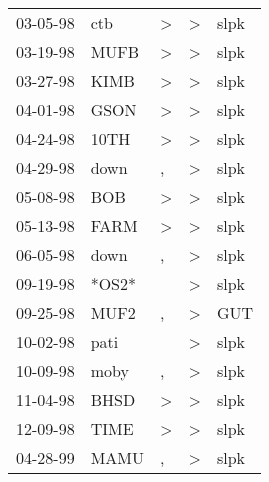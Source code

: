 \begin{supertabular}{p{0.07\textwidth}p{0.06\textwidth}p{0.02\textwidth}p{0.02\textwidth}p{0.06\textwidth}}
 03-05-98\textsuperscript{} &   ctb\textsuperscript{} &  \textgreater &  \textgreater &  slpk\textsuperscript{} \\
 03-19-98\textsuperscript{} &  MUFB\textsuperscript{} &  \textgreater &  \textgreater &  slpk\textsuperscript{} \\
 03-27-98\textsuperscript{} &  KIMB\textsuperscript{} &  \textgreater &  \textgreater &  slpk\textsuperscript{} \\
 04-01-98\textsuperscript{} &  GSON\textsuperscript{} &  \textgreater &  \textgreater &  slpk\textsuperscript{} \\
 04-24-98\textsuperscript{} &  10TH\textsuperscript{} &  \textgreater &  \textgreater &  slpk\textsuperscript{} \\
 04-29-98\textsuperscript{} &  down\textsuperscript{} &             , &  \textgreater &  slpk\textsuperscript{} \\
 05-08-98\textsuperscript{} &   BOB\textsuperscript{} &  \textgreater &  \textgreater &  slpk\textsuperscript{} \\
 05-13-98\textsuperscript{} &  FARM\textsuperscript{} &  \textgreater &  \textgreater &  slpk\textsuperscript{} \\
 06-05-98\textsuperscript{} &  down\textsuperscript{} &             , &  \textgreater &  slpk\textsuperscript{} \\
 09-19-98\textsuperscript{} &                   *OS2* &               &  \textgreater &  slpk\textsuperscript{} \\
 09-25-98\textsuperscript{} &  MUF2\textsuperscript{} &             , &  \textgreater &   GUT\textsuperscript{} \\
 10-02-98\textsuperscript{} &  pati\textsuperscript{} &               &  \textgreater &  slpk\textsuperscript{} \\
 10-09-98\textsuperscript{} &  moby\textsuperscript{} &             , &  \textgreater &  slpk\textsuperscript{} \\
 11-04-98\textsuperscript{} &  BHSD\textsuperscript{} &  \textgreater &  \textgreater &  slpk\textsuperscript{} \\
 12-09-98\textsuperscript{} &  TIME\textsuperscript{} &  \textgreater &  \textgreater &  slpk\textsuperscript{} \\
 04-28-99\textsuperscript{} &  MAMU\textsuperscript{} &             , &  \textgreater &  slpk\textsuperscript{} \\

\end{supertabular}
